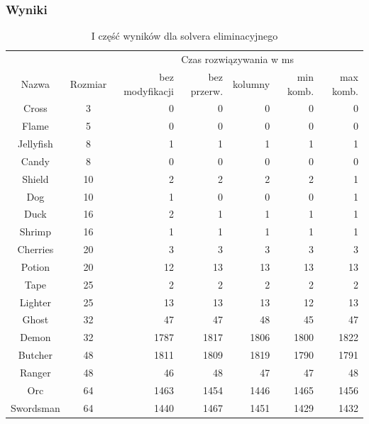 \subsubsection{Wyniki}

\begin{table}[h!]
    \begin{center}
        \begin{tabular}{|c|c|r r r r r|}
            \hline
            {}          & {}        & \multicolumn{5}{c|}{Czas rozwiązywania w ms} \\
            Nazwa       & Rozmiar   & bez modyfikacji & bez przerw. & kolumny & min komb. & max komb. \\
            \hline
            Cross       & 3         & 0     & 0     & 0     & 0     & 0     \\
            Flame       & 5         & 0     & 0     & 0     & 0     & 0     \\
            Jellyfish   & 8         & 1     & 1     & 1     & 1     & 1     \\
            Candy       & 8         & 0     & 0     & 0     & 0     & 0     \\
            Shield      & 10        & 2     & 2     & 2     & 2     & 1     \\
            Dog         & 10        & 1     & 0     & 0     & 0     & 1     \\
            Duck        & 16        & 2     & 1     & 1     & 1     & 1     \\
            Shrimp      & 16        & 1     & 1     & 1     & 1     & 1     \\
            Cherries    & 20        & 3     & 3     & 3     & 3     & 3     \\
            Potion      & 20        & 12    & 13    & 13    & 13    & 13    \\
            Tape        & 25        & 2     & 2     & 2     & 2     & 2     \\
            Lighter     & 25        & 13    & 13    & 13    & 12    & 13    \\
            \hline
            Ghost       & 32        & 47    & 47    & 48    & 45    & 47    \\
            Demon       & 32        & 1787  & 1817  & 1806  & 1800  & 1822  \\
            Butcher     & 48        & 1811  & 1809  & 1819  & 1790  & 1791  \\
            Ranger      & 48        & 46    & 48    & 47    & 47    & 48    \\
            Orc         & 64        & 1463  & 1454  & 1446  & 1465  & 1456  \\
            Swordsman   & 64        & 1440  & 1467  & 1451  & 1429  & 1432  \\
            \hline
        \end{tabular}
    \end{center}
    \caption{I część wyników dla solvera eliminacyjnego}
\end{table}

